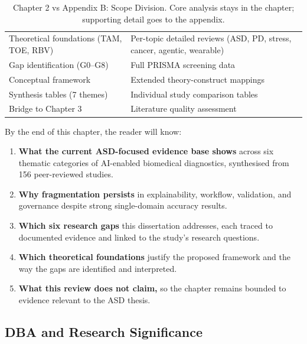 \begin{table}[H]
\centering
\caption[Chapter 2 vs Appendix B: Scope Division]{Chapter 2 vs Appendix B: Scope Division. Core analysis stays in the chapter; supporting detail goes to the appendix.}
\tablestripes\tablefontsize
\begin{tabularx}{\textwidth}{@{} L L @{}}
\toprule
{} &  \\
\midrule
Theoretical foundations (TAM, TOE, RBV) & Per-topic detailed reviews (ASD, PD, stress, cancer, agentic, wearable) \\
\addlinespace
Gap identification (G0--G8) & Full PRISMA screening data \\
\addlinespace
Conceptual framework & Extended theory-construct mappings \\
\addlinespace
Synthesis tables (7 themes) & Individual study comparison tables \\
\addlinespace
Bridge to Chapter 3 & Literature quality assessment \\
\bottomrule
\end{tabularx}
\end{table}

\noindent By the end of this chapter, the reader will know:

\begin{enumerate}[label=(\alph*)]
    \item \textbf{What the current ASD-focused evidence base shows} across six thematic categories of AI-enabled biomedical diagnostics, synthesised from 156 peer-reviewed studies.
    \item \textbf{Why fragmentation persists} in explainability, workflow, validation, and governance despite strong single-domain accuracy results.
    \item \textbf{Which six research gaps} this dissertation addresses, each traced to documented evidence and linked to the study's research questions.
    \item \textbf{Which theoretical foundations} justify the proposed framework and the way the gaps are identified and interpreted.
    \item \textbf{What this review does not claim,} so the chapter remains bounded to evidence relevant to the ASD thesis.
\end{enumerate}

\subsection{DBA and Research Significance}


